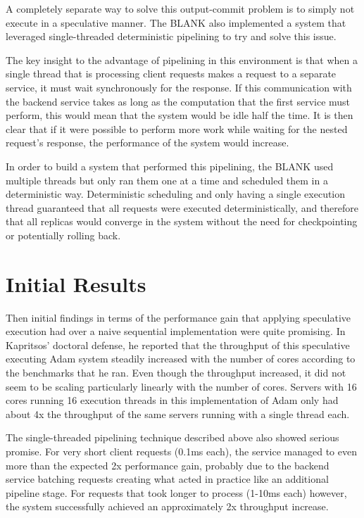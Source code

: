 \documentclass[11pt, oneside]{report}
\begin{document}
A completely separate way to solve this output-commit problem is to simply not execute in a speculative manner. 
The
BLANK %
also implemented a system that leveraged single-threaded deterministic pipelining to try and solve this issue.

The key insight to the advantage of pipelining in this environment is that when a single thread that is processing client requests makes a request to a separate service, it must wait synchronously for the response. 
If this communication with the backend service takes as long as the computation that the first service must perform, this would mean that the system would be idle half the time. 
It is then clear that if it were possible to perform more work while waiting for the nested request's response, the performance of the system would increase.

In order to build a system that performed this pipelining, the BLANK used multiple threads but only ran them one at a time and scheduled them in a deterministic way. 
Deterministic scheduling and only having a single execution thread guaranteed that all requests were executed deterministically, and therefore that all replicas would converge in the system without the need for checkpointing or potentially rolling back. 


\section{Initial Results}

Then initial findings in terms of the performance gain that applying speculative execution had over a naive sequential implementation were quite promising. 
In Kapritsos' doctoral defense, he reported that the throughput of this speculative executing Adam system steadily increased with the number of cores according to the benchmarks that he ran. 
Even though the throughput increased, it did not seem to be scaling particularly linearly with the number of cores. 
Servers with 16 cores running 16 execution threads in this implementation of Adam only had about 4x the throughput of the same servers running with a single thread each.

The single-threaded pipelining technique described above also showed serious promise. 
For very short client requests (0.1ms each), the service managed to even more than the expected 2x performance gain, probably due to the backend service batching requests creating what acted in practice like an additional pipeline stage. 
For requests that took longer to process (1-10ms each) however, the system successfully achieved an approximately 2x throughput increase.
\end{document}
